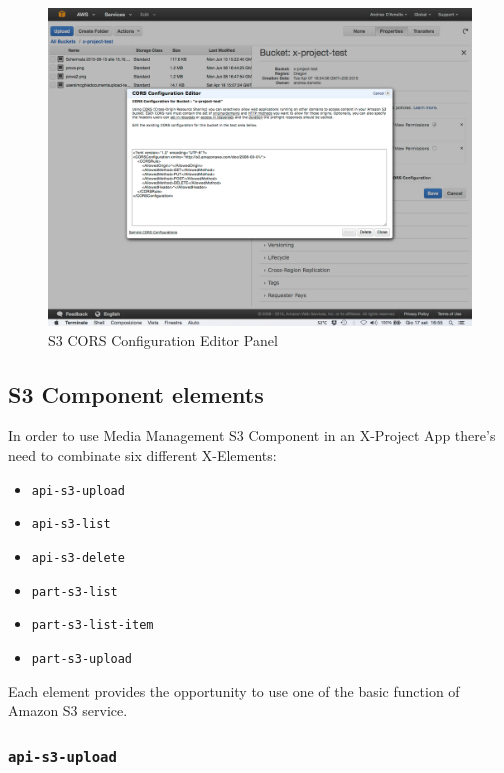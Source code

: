 \begin {figure}[h]
\graphicspath{{images/chapter_s3/}}
\includegraphics[width=\textwidth]{s3panel}
\caption{S3 CORS Configuration Editor Panel}
\end {figure}









\subsection{S3 Component elements}
\label{subsec:S3_server_elem}


In order to use Media Management S3 Component in an X-Project App there's need to combinate six different X-Elements:
\begin{itemize}

\item\texttt{api-s3-upload}
\item\texttt{api-s3-list}
\item\texttt{api-s3-delete}
\item\texttt{part-s3-list}
\item\texttt{part-s3-list-item}
\item\texttt{part-s3-upload}

\end{itemize}

Each element provides the opportunity to use one of the basic function of Amazon S3 service. 

\subsubsection{\texttt{api-s3-upload}}
\label{api-s3-upload}


